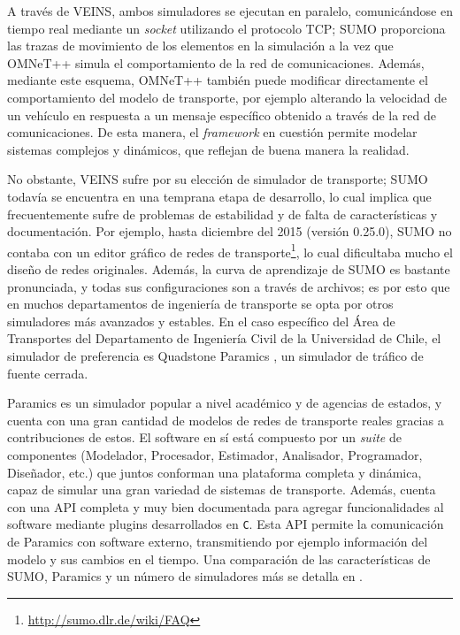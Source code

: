 A través de VEINS, ambos simuladores se ejecutan en paralelo, comunicándose en tiempo real mediante un \textit{socket} utilizando el protocolo TCP; SUMO proporciona las trazas de movimiento de los elementos en la simulación a la vez que OMNeT++ simula el comportamiento de la red de comunicaciones. Además, mediante este esquema, OMNeT++ también puede modificar directamente el comportamiento del modelo de transporte, por ejemplo alterando la velocidad de un vehículo en respuesta a un mensaje específico obtenido a través de la red de comunicaciones. De esta manera, el \textit{framework} en cuestión permite modelar sistemas complejos y dinámicos, que reflejan de buena manera la realidad.

No obstante, VEINS sufre por su elección de simulador de transporte; SUMO todavía se encuentra en una temprana etapa de desarrollo, lo cual implica que frecuentemente sufre de problemas de estabilidad y de falta de características y documentación. Por ejemplo, hasta diciembre del 2015 (versión 0.25.0), SUMO no contaba con un editor gráfico de redes de transporte\footnote{\url{http://sumo.dlr.de/wiki/FAQ}}, lo cual dificultaba mucho el diseño de redes originales. Además, la curva de aprendizaje de SUMO es bastante pronunciada, y todas sus configuraciones son a través de archivos; es por esto que en muchos departamentos de ingeniería de transporte se opta por otros simuladores más avanzados y estables. En el caso específico del Área de Transportes del Departamento de Ingeniería Civil de la Universidad de Chile, el simulador de preferencia es Quadstone Paramics \autocite{paramics,kotusevski2009review}, un simulador de tráfico de fuente cerrada.

Paramics es un simulador popular a nivel académico y de agencias de estados, y cuenta con una gran cantidad de modelos de redes de transporte reales gracias a contribuciones de estos. El software en sí está compuesto por un \textit{suite} de componentes (Modelador,
Procesador, Estimador, Analisador, Programador, Diseñador, etc.) que juntos conforman una plataforma completa y dinámica, capaz de simular una gran variedad de sistemas de transporte. Además, cuenta con una API completa y muy bien documentada para agregar funcionalidades al software mediante plugins desarrollados en \texttt{C}. Esta API permite la comunicación de Paramics con software externo, transmitiendo por ejemplo información del modelo y sus cambios en el tiempo. Una comparación de las características de SUMO, Paramics y un número de simuladores más se detalla en  \autocite{kotusevski2009review}.

